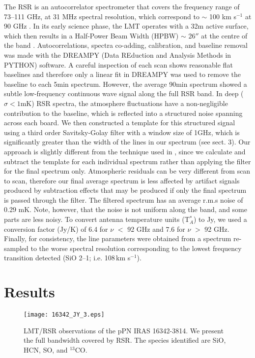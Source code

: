 \documentclass[a4paper,fleqn,usenatbib]{mnras}
\begin{document}
The RSR is an autocorrelator spectrometer that covers the frequency range of 73--111 GHz, at 31 MHz spectral resolution, which correspond to $\sim$ 100 km s$^{-1}$ at 90 GHz \citep{Erickson07}. In its early science phase, the LMT operates with a 32m active surface, which then results in a Half-Power Beam Width (HPBW) $\sim$ 26$''$ at the centre of the band \citep[{RSR data has been reported in a number of papers, for an example see} ][]{Cybulski16}. Autocorrelations, spectra co-adding, calibration, and baseline removal was made with the DREAMPY (Data REduction and Analysis Methods in PYTHON) software. A careful inspection of each scan shows reasonable flat baselines and therefore only a linear fit in DREAMPY was used to remove the baseline to each 5min spectrum. However, the average 90min spectrum showed a subtle low-frequency continuous wave signal along the full RSR band. In deep ($\sigma <1$mK) RSR spectra, the atmosphere fluctuations have a non-negligible contribution to the baseline, which is reflected into a structured noise spanning across each board. We then constructed a template for this structured signal using a third order Savitsky-Golay filter with a window size of 1GHz, which is significantly greater than the width of the lines in our spectrum (see sect. 3). Our approach is slightly different from the technique used in \citet{Cybulski16}, since we calculate and subtract the template for each individual spectrum rather than applying the filter for the final spectrum only. Atmospheric residuals can be very different from scan to scan, therefore our final average spectrum is less affected by artifact signals produced by subtraction effects that may be produced if only the final spectrum is passed through the filter. The filtered spectrum has an average r.m.s noise of 0.29 mK. Note, however, that the noise is not uniform along the band, and some parts are less noisy. To convert antenna temperature units (T$_A^*$) to Jy, we used a conversion factor (Jy/K) of 6.4 for $\nu$ $<$ 92 GHz and 7.6 for $\nu$ $>$ 92 GHz. Finally, for consistency, the line parameters were obtained from a spectrum re-sampled to the worse spectral resolution corresponding to the lowest frequency transition detected (SiO 2--1; i.e. 108\,km s$^{-1}$). 

\section{Results}

\begin{figure}
\centering
\texttt{[image: 16342\_JY\_3.eps]}
\caption{LMT/RSR observations of the pPN IRAS 16342-3814. We present the full bandwidth covered by RSR. The species identified are SiO, HCN, SO, and $^{13}$CO.}
\label{rsr}
\end{figure}
\end{document}
